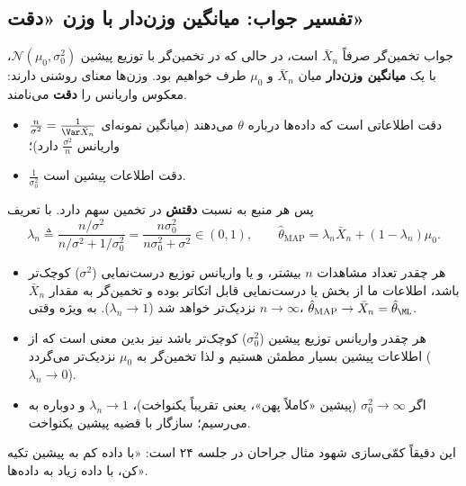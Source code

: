 \subsection{تفسیر جواب: میانگین وزن‌دار با وزن «دقت»}
جواب تخمین‌گر  صرفاً $\bar X_n$ است، در حالی که در تخمین‌گر  با توزیع پیشین $\mathcal N(\mu_0,\sigma_0^2)$، با یک \textbf{میانگین وزن‌دار} میان $\bar X_n$ و $\mu_0$ طرف خواهیم بود. وزن‌ها معنای روشنی دارند: معکوس واریانس را \textbf{دقت } می‌نامند.
\begin{itemize}
\item $\frac{n}{\sigma^2}=\frac{1}{\Var\bar X_n}$ دقت اطلاعاتی است که داده‌ها درباره $\theta$ می‌دهند (میانگین نمونه‌ای واریانس $\frac{\sigma^2}{n}$ دارد)؛
\item $\frac{1}{\sigma_0^2}$ دقت اطلاعات پیشین است.
\end{itemize}
پس هر منبع به نسبت \textbf{دقتش} در تخمین سهم دارد. با تعریف
\[
\lambda_n\triangleq\frac{n/\sigma^2}{n/\sigma^2+1/\sigma_0^2}=\frac{n\sigma_0^2}{n\sigma_0^2+\sigma^2}\in(0,1),
\qquad
\hat\theta_{\mathrm{MAP}}=\lambda_n\bar X_n+(1-\lambda_n)\mu_0 .
\]
\begin{itemize}
\item هر چقدر تعداد مشاهدات $n$ بیشتر، و یا واریانس توزیع درست‌نمایی ($\sigma^2$) کوچک‌تر باشد، اطلاعات  ما از بخش  یا درست‌نمایی قابل اتکاتر بوده و تخمین‌گر به مقدار $\bar X_n$ نزدیک‌تر خواهد شد ($\lambda_n\to1$). به ویژه وقتی $n\to\infty$، $\hat\theta_{\mathrm{MAP}}\to\bar X_n=\hat\theta_\ML$.
\item هر چقدر واریانس توزیع پیشین ($\sigma_0^2$) کوچک‌تر باشد نیز بدین معنی است که از اطلاعات پیشین بسیار مطمئن هستیم و لذا تخمین‌گر به $\mu_0$ نزدیک‌تر می‌گردد ($\lambda_n\to0$).
\item اگر $\sigma_0^2\to\infty$ (پیشین «کاملاً پهن»، یعنی تقریباً یکنواخت)، $\lambda_n\to1$ و دوباره به  می‌رسیم؛ سازگار با قضیه پیشین یکنواخت.
\end{itemize}
این دقیقاً کمّی‌سازی شهود مثال جراحان در جلسه ۲۴ است: «با داده کم به پیشین تکیه کن، با داده زیاد به داده‌ها».

